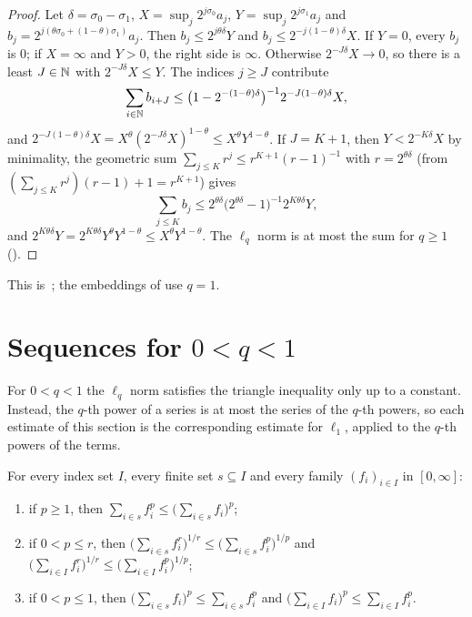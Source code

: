 \begin{proof}
\leanok
Let $\delta = \sigma_0 - \sigma_1$, $X = \sup_j 2^{j\sigma_0} a_j$, $Y = \sup_j 2^{j\sigma_1} a_j$
and $b_j = 2^{j(\theta\sigma_0 + (1-\theta)\sigma_1)} a_j$. Then $b_j \leq 2^{j\theta\delta} Y$
and $b_j \leq 2^{-j(1-\theta)\delta} X$. If $Y = 0$, every $b_j$ is $0$; if $X = \infty$ and
$Y > 0$, the right side is $\infty$. Otherwise $2^{-J\delta} X \to 0$, so there is a least
$J \in \mathbb{N}$ with $2^{-J\delta} X \leq Y$. The indices $j \geq J$ contribute
\[
  \sum_{i \in \mathbb{N}} b_{i+J} \leq \bigl(1 - 2^{-(1-\theta)\delta}\bigr)^{-1} 2^{-J(1-\theta)\delta} X ,
\]
and $2^{-J(1-\theta)\delta} X = X^\theta (2^{-J\delta} X)^{1-\theta} \leq X^\theta Y^{1-\theta}$.
If $J = K + 1$, then $Y < 2^{-K\delta} X$ by minimality, the geometric sum
$\sum_{j \leq K} r^j \leq r^{K+1} (r - 1)^{-1}$ with $r = 2^{\theta\delta}$ (from
$(\sum_{j \leq K} r^j)(r - 1) + 1 = r^{K+1}$) gives
\[
  \sum_{j \leq K} b_j
  \leq 2^{\theta\delta} \bigl(2^{\theta\delta} - 1\bigr)^{-1} 2^{K\theta\delta} Y ,
\]
and $2^{K\theta\delta} Y = 2^{K\theta\delta} Y^\theta Y^{1-\theta}
\leq X^\theta Y^{1-\theta}$. The $\ell_q$ norm is at most the sum for $q \geq 1$
().
\end{proof}

This is~\cite[Lemma~2]{JohnsenSickel2007}; the embeddings of
 use $q = 1$.

\section{Sequences for \texorpdfstring{$0 < q < 1$}{0 < q < 1}}
\label{sec:lq-below-one}

For $0 < q < 1$ the $\ell_q$ norm satisfies the triangle inequality only up to a constant.
Instead, the $q$-th power of a series is at most the series of the $q$-th powers, so each
estimate of this section is the corresponding estimate for $\ell_1$, applied to the $q$-th powers
of the terms.

\begin{lemma}
\label{lem:rpow-sum-le}
\leanok
For every index set $I$, every finite set $s \subseteq I$ and every family $(f_i)_{i \in I}$ in
$[0, \infty]$:
\begin{enumerate}
  \item if $p \geq 1$, then $\sum_{i \in s} f_i^p \leq \bigl(\sum_{i \in s} f_i\bigr)^p$;
  \item if $0 < p \leq r$, then
    $\bigl(\sum_{i \in s} f_i^r\bigr)^{1/r} \leq \bigl(\sum_{i \in s} f_i^p\bigr)^{1/p}$ and
    $\bigl(\sum_{i \in I} f_i^r\bigr)^{1/r} \leq \bigl(\sum_{i \in I} f_i^p\bigr)^{1/p}$;
  \item if $0 < p \leq 1$, then $\bigl(\sum_{i \in s} f_i\bigr)^p \leq \sum_{i \in s} f_i^p$ and
    $\bigl(\sum_{i \in I} f_i\bigr)^p \leq \sum_{i \in I} f_i^p$.
\end{enumerate}
\end{lemma}

